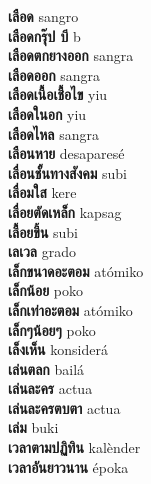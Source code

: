 \textbf{ เลือด  } sangro \\
\textbf{ เลือดกรุ๊ป บี  } b \\
\textbf{ เลือดตกยางออก  } sangra \\
\textbf{ เลือดออก  } sangra \\
\textbf{ เลือดเนื้อเชื้อไข  } yiu \\
\textbf{ เลือดในอก  } yiu \\
\textbf{ เลือดไหล  } sangra \\
\textbf{ เลือนหาย  } desaparesé \\
\textbf{ เลื่อนชั้นทางสังคม  } subi \\
\textbf{ เลื่อมใส  } kere \\
\textbf{ เลื่อยตัดเหล็ก  } kapsag \\
\textbf{ เลื้อยขึ้น  } subi \\
\textbf{ เลเวล  } grado \\
\textbf{ เล็กขนาดอะตอม  } atómiko \\
\textbf{ เล็กน้อย  } poko \\
\textbf{ เล็กเท่าอะตอม  } atómiko \\
\textbf{ เล็กๆน้อยๆ  } poko \\
\textbf{ เล็งเห็น  } konsiderá \\
\textbf{ เล่นตลก  } bailá \\
\textbf{ เล่นละคร  } actua \\
\textbf{ เล่นละครตบตา  } actua \\
\textbf{ เล่ม  } buki \\
\textbf{ เวลาตามปฏิทิน  } kalènder \\
\textbf{ เวลาอันยาวนาน  } époka \\
